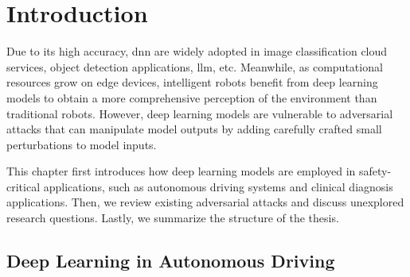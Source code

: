\chapter{Introduction}
\label{chpt:intro}

Due to its high accuracy, \acrfull{dnn} are widely adopted in image classification cloud services, object detection applications, \acrfull{llm}, etc. Meanwhile, as computational resources grow on edge devices, intelligent robots benefit from deep learning models to obtain a more comprehensive perception of the environment than traditional robots. However, deep learning models are vulnerable to adversarial attacks that can manipulate model outputs by adding carefully crafted small perturbations to model inputs.

This chapter first introduces how deep learning models are employed in safety-critical applications, such as autonomous driving systems and clinical diagnosis applications. Then, we review existing adversarial attacks and discuss unexplored research questions. Lastly, we summarize the structure of the thesis.


\section{Deep Learning in Autonomous Driving}
\label{sec:deep_learning}



